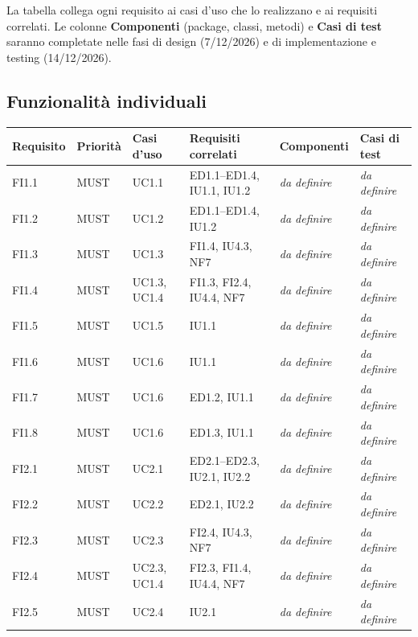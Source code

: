 La tabella collega ogni requisito ai casi d'uso che lo realizzano e ai requisiti correlati. Le colonne \textbf{Componenti} (package, classi, metodi) e \textbf{Casi di test} saranno completate nelle fasi di design (7/12/2026) e di implementazione e testing (14/12/2026).

\subsection{Funzionalità individuali}
{\footnotesize\setlength{\tabcolsep}{3pt}
\begin{longtable}{|P{1.3cm}|P{2.0cm}|P{1.8cm}|P{2.4cm}|P{1.6cm}|P{1.5cm}|}\hline
\textbf{Requisito} & \textbf{Priorità} & \textbf{Casi d'uso} & \textbf{Requisiti correlati} & \textbf{Componenti} & \textbf{Casi di test} \\ \hline
\endhead
FI1.1 & MUST & UC1.1 & ED1.1–ED1.4, IU1.1, IU1.2 & \textit{da definire} & \textit{da definire} \\ \hline
FI1.2 & MUST & UC1.2 & ED1.1–ED1.4, IU1.2 & \textit{da definire} & \textit{da definire} \\ \hline
FI1.3 & MUST & UC1.3 & FI1.4, IU4.3, NF7 & \textit{da definire} & \textit{da definire} \\ \hline
FI1.4 & MUST & UC1.3, UC1.4 & FI1.3, FI2.4, IU4.4, NF7 & \textit{da definire} & \textit{da definire} \\ \hline
FI1.5 & MUST & UC1.5 & IU1.1 & \textit{da definire} & \textit{da definire} \\ \hline
FI1.6 & MUST & UC1.6 & IU1.1 & \textit{da definire} & \textit{da definire} \\ \hline
FI1.7 & MUST & UC1.6 & ED1.2, IU1.1 & \textit{da definire} & \textit{da definire} \\ \hline
FI1.8 & MUST & UC1.6 & ED1.3, IU1.1 & \textit{da definire} & \textit{da definire} \\ \hline
FI2.1 & MUST & UC2.1 & ED2.1–ED2.3, IU2.1, IU2.2 & \textit{da definire} & \textit{da definire} \\ \hline
FI2.2 & MUST & UC2.2 & ED2.1, IU2.2 & \textit{da definire} & \textit{da definire} \\ \hline
FI2.3 & MUST & UC2.3 & FI2.4, IU4.3, NF7 & \textit{da definire} & \textit{da definire} \\ \hline
FI2.4 & MUST & UC2.3, UC1.4 & FI2.3, FI1.4, IU4.4, NF7 & \textit{da definire} & \textit{da definire} \\ \hline
FI2.5 & MUST & UC2.4 & IU2.1 & \textit{da definire} & \textit{da definire} \\ \hline

\end{longtable}}
